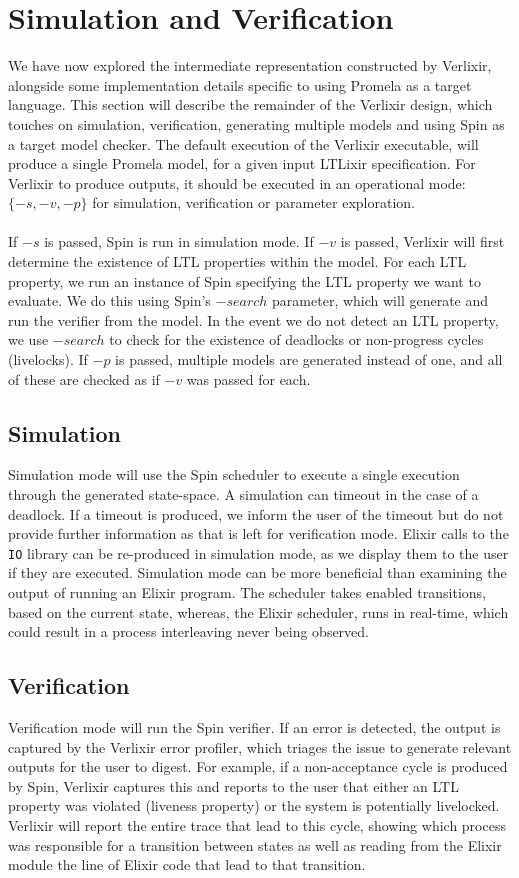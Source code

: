 \section{Simulation and Verification} \label{sec:simulation_verification}
We have now explored the intermediate representation constructed by Verlixir, alongside some implementation details specific to using Promela as a target language. This section will describe the remainder of the Verlixir design, which touches on simulation, verification, generating multiple models and using Spin as a target model checker. The default execution of the Verlixir executable, will produce a single Promela model, for a given input LTLixir specification. For Verlixir to produce outputs, it should be executed in an operational mode: $\{-s, -v, -p\}$ for simulation, verification or parameter exploration.
\\ \\
If $-s$ is passed, Spin is run in simulation mode. If $-v$ is passed, Verlixir will first determine the existence of LTL properties within the model. For each LTL property, we run an instance of Spin specifying the LTL property we want to evaluate. We do this using Spin's $-search$ parameter, which will generate and run the verifier from the model. In the event we do not detect an LTL property, we use $-search$ to check for the existence of deadlocks or non-progress cycles (livelocks). If $-p$ is passed, multiple models are generated instead of one, and all of these are checked as if $-v$ was passed for each.
\subsection{Simulation}
Simulation mode will use the Spin scheduler to execute a single execution through the generated state-space. A simulation can timeout in the case of a deadlock. If a timeout is produced, we inform the user of the timeout but do not provide further information as that is left for verification mode. Elixir calls to the \texttt{IO} library can be re-produced in simulation mode, as we display them to the user if they are executed. Simulation mode can be more beneficial than examining the output of running an Elixir program. The scheduler takes enabled transitions, based on the current state, whereas, the Elixir scheduler, runs in real-time, which could result in a process interleaving never being observed.
\subsection{Verification}
Verification mode will run the Spin verifier. If an error is detected, the output is captured by the Verlixir error profiler, which triages the issue to generate relevant outputs for the user to digest. For example, if a non-acceptance cycle is produced by Spin, Verlixir captures this and reports to the user that either an LTL property was violated (liveness property) or the system is potentially livelocked. Verlixir will report the entire trace that lead to this cycle, showing which process was responsible for a transition between states as well as reading from the Elixir module the line of Elixir code that lead to that transition. 
\\ \\

